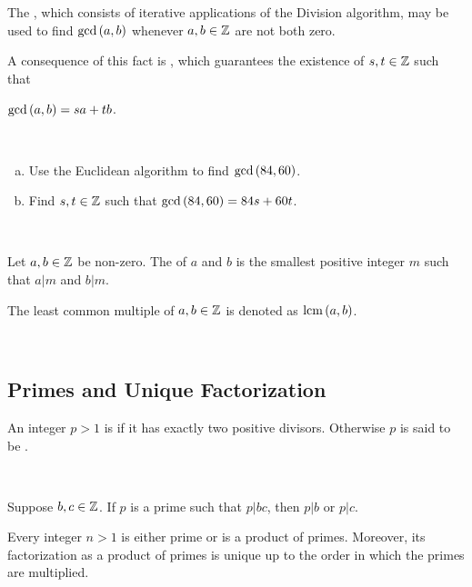 \documentclass[11pt,fleqn,dvipsnames,usenames]{article}
\newcommand{\p}{\noindent}
\begin{document}
\GRAYLINE
\vsmsp

\p The , which consists of iterative applications of the Division algorithm, may be used to find $\text{gcd}\left(a,b\right)$ whenever $a,b\in \mathbb{Z}$ are not both zero.
\vsp

\p A consequence of this fact is , which guarantees the existence of $s,t\in\mathbb{Z}$ such that \begin{center}
$\text{gcd}\left(a,b\right) = sa + tb$.
\end{center}
\vsp

%
\begin{example*}~
\begin{enumerate}[(a)]
\item Use the Euclidean algorithm to find $\text{gcd}\left(84,60\right)$.
\item Find $s,t\in\mathbb{Z}$ such that $\text{gcd}\left(84,60\right) = 84s + 60t$.
\end{enumerate}
\end{example*}
%
\begin{solution}~
\newpage

\end{solution}
%
\begin{definition}
Let $a,b\in\mathbb{Z}$ be non-zero.  The  of $a$ and $b$ is the smallest positive integer $m$ such that $a|m$ and $b|m$.
\end{definition}
%
\notation The least common multiple of $a,b\in\mathbb{Z}$ is denoted as $\text{lcm}\left(a,b\right)$.
\vsp

\begin{example*}~
\vspace{1cm}

\end{example*}

\subsection{Primes and Unique Factorization}

\begin{definition}
An integer $p > 1$ is  if it has exactly two positive divisors.  Otherwise $p$ is said to be .
\end{definition}
\vsmsp

\begin{example*}~
\vspace{1cm}

\end{example*}

\begin{theorem*}\label{euclidslemma}
Suppose $b,c\in\mathbb{Z}$.  If $p$ is a prime such that $p|bc$, then $p|b$ or $p|c$.
\end{theorem*}
%
\begin{theorem}
Every integer $n > 1$ is either prime or is a product of primes.  Moreover, its factorization as a product of primes is unique up to the order in which the primes are multiplied.
\end{theorem}
%
\begin{examples*}~
\vspace{5cm}

\end{examples*}
\end{document}
